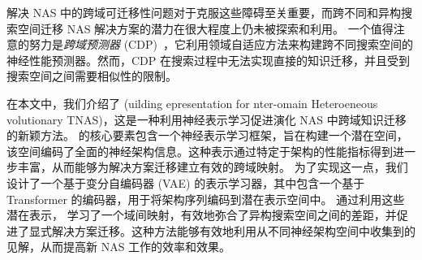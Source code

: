 \documentclass[../main_zh.tex]{subfiles}
\begin{document}
解决 NAS 中的跨域可迁移性问题对于克服这些障碍至关重要，而跨不同和异构搜索空间迁移 NAS 解决方案的潜力在很大程度上仍未被探索和利用。
一个值得注意的努力是\textit{跨域预测器} (CDP)~\cite{DBLP:conf/nips/0002TLW022}，它利用领域自适应方法来构建跨不同搜索空间的神经性能预测器。然而，CDP 在搜索过程中无法实现直接的知识迁移，并且受到搜索空间之间需要相似性的限制。


在本文中，我们介绍了 \OUR{} (uilding epresentation for nter-omain Heteroeneous volutionary TNAS)，这是一种利用神经表示学习促进演化 NAS 中跨域知识迁移的新颖方法。 \OUR{} 的核心要素包含一个神经表示学习框架，旨在构建一个潜在空间，该空间编码了全面的神经架构信息。这种表示通过特定于架构的性能指标得到进一步丰富，从而能够为解决方案迁移建立有效的跨域映射。
为了实现这一点，我们设计了一个基于变分自编码器 (VAE) 的表示学习器，其中包含一个基于 Transformer 的编码器，用于将架构序列编码到潜在表示空间中。
通过利用这些潜在表示，\OUR{} 学习了一个域间映射，有效地弥合了异构搜索空间之间的差距，并促进了显式解决方案迁移。这种方法能够有效地利用从不同神经架构空间中收集到的见解，从而提高新 NAS 工作的效率和效果。
\end{document}
